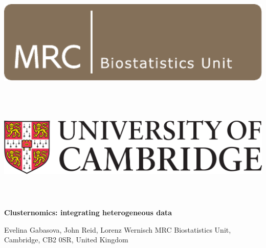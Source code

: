 \documentclass[t, final]{beamer}
\begin{document}
\begin{frame}{}

%
\begin{block}{
  \vspace{24pt}

  \includegraphics[height=150pt]{Figures/BSU}
  \hspace{30pt}
  \includegraphics[height=150pt]{Figures/UniCam}

  \vspace{24pt}
}
  \vspace{24pt}

  \begin{center}
    \fontsize{82pt}{82pt}\selectfont \textcolor{mrcblue}{\textbf{Clusternomics: integrating heterogeneous data}}
  \end{center}

  \vspace{24pt}

  \fontsize{36pt}{36pt}\selectfont
  \textcolor{mrcblue}{
    Evelina Gabasova,
    John Reid,
    Lorenz Wernisch
    \hfill
    MRC Biostatistics Unit,
    Cambridge,
    CB2 0SR,
    United Kingdom}
\end{block}


%



\end{frame}
\end{document}
